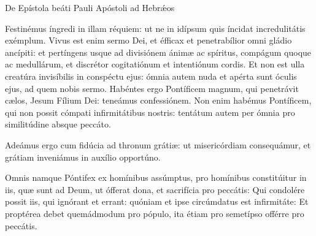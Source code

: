 





\lesson

De Epístola beáti Pauli Apóstoli ad Hebrǽos


Festinémus íngredi in illam réquiem: ut ne in idípsum quis íncidat
incredulitátis exémplum. Vivus est enim sermo Dei, et éfficax et penetrabílior
omni gládio ancípiti: et pertíngens usque ad divisiónem ánimæ ac spíritus,
compágum quoque ac medullárum, et discrétor cogitatiónum et intentiónum cordis.
Et non est ulla creatúra invisíbilis in conspéctu ejus: ómnia autem nuda et
apérta sunt óculis ejus, ad quem nobis sermo. Habéntes ergo Pontíficem magnum,
qui penetrávit cælos, Jesum Fílium Dei: teneámus confessiónem. Non enim habémus
Pontíficem, qui non possit cómpati infirmitátibus nostris: tentátum autem per
ómnia pro similitúdine absque peccáto.


\lesson


Adeámus ergo cum fidúcia ad thronum grátiæ: ut misericórdiam consequámur, et
grátiam inveniámus in auxílio opportúno. 

Omnis namque Póntifex ex homínibus assúmptus, pro homínibus constitúitur in
iis, quæ sunt ad Deum, ut ófferat dona, et sacrifícia pro peccátis: Qui
condolére possit iis, qui ignórant et errant: quóniam et ipse circúmdatus est
infirmitáte: Et proptérea debet quemádmodum pro pópulo, ita étiam pro semetípso
offérre pro peccátis.


\lesson

